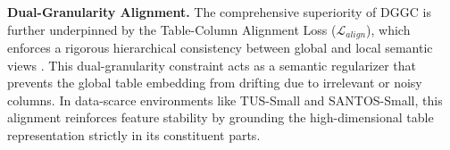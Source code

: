 
\noindent\textbf{Dual-Granularity Alignment.} The comprehensive superiority of DGGC is further underpinned by the Table-Column Alignment Loss ($\mathcal{L}_{align}$), which enforces a rigorous hierarchical consistency between global and local semantic views \cite{hjelm2018learning}. This dual-granularity constraint acts as a semantic regularizer that prevents the global table embedding from drifting due to irrelevant or noisy columns. In data-scarce environments like TUS-Small and SANTOS-Small, this alignment reinforces feature stability by grounding the high-dimensional table representation strictly in its constituent parts.




